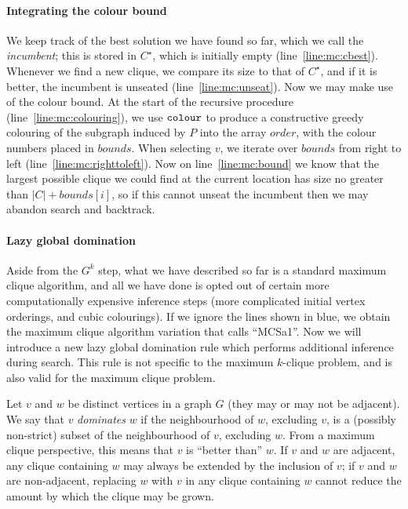 \documentclass[letterpaper]{article}
\newcommand{\mcline}[1]{line~\ref{line:mc:#1}}
\newcommand{\Cbest}{C^\star}
\newcommand{\bounds}{\mathit{bounds}}
\newcommand{\order}{\mathit{order}}
\newcommand{\colourOrder}{\FuncSty{colour}}
\begin{document}
\paragraph{Integrating the colour bound}

We keep track of the best solution we have found so far, which we call the \emph{incumbent}; this is
stored in $\Cbest$, which is initially empty (\mcline{cbest}). Whenever we find a new clique, we
compare its size to that of $\Cbest$, and if it is better, the incumbent is unseated
(\mcline{unseat}). Now we may make use of the colour bound. At the start of the recursive procedure
(\mcline{colouring}), we use $\colourOrder$ to produce a constructive greedy colouring of the
subgraph induced by $P$ into the array $\order$, with the colour numbers placed in $\bounds$. When
selecting $v$, we iterate over $\bounds$ from right to left (\mcline{righttoleft}). Now on
\mcline{bound} we know that the largest possible clique we could find at the current location has
size no greater than $|C| + \bounds[i]$, so if this cannot unseat the incumbent then we may abandon
search and backtrack.

\paragraph{Lazy global domination}

Aside from the $G^k$ step, what we have described so far is a standard maximum clique algorithm, and
all we have done is opted out of certain more computationally expensive inference steps (more
complicated initial vertex orderings, and cubic colourings). If we ignore the lines shown in blue,
we obtain the maximum clique algorithm variation that \citeauthor{Prosser:2012}
 calls ``MCSa1''.  Now we will introduce a new lazy global domination rule
which performs additional inference during search. This rule is not specific to the maximum
$k$-clique problem, and is also valid for the maximum clique problem.

Let $v$ and $w$ be distinct vertices in a graph $G$ (they may or may not be adjacent). We say that
$v$ \emph{dominates} $w$ if the neighbourhood of $w$, excluding $v$, is a (possibly non-strict)
subset of the neighbourhood of $v$, excluding $w$. From a maximum clique perspective, this means
that $v$ is ``better than'' $w$. If $v$ and $w$ are adjacent, any clique containing $w$ may always
be extended by the inclusion of $v$; if $v$ and $w$ are non-adjacent, replacing $w$ with $v$ in any
clique containing $w$ cannot reduce the amount by which the clique may be grown.
\end{document}
